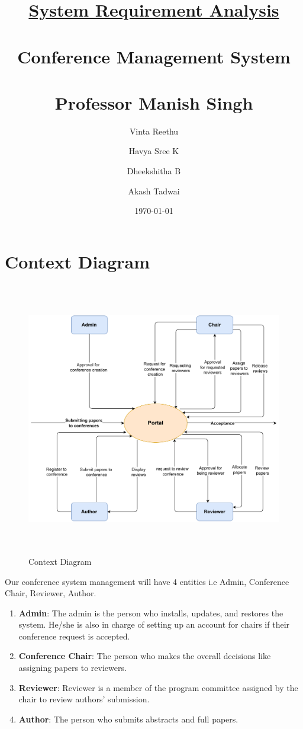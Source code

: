 \documentclass[english,a4paper,12pt]{report}
\title{\textbf{\underline{\Huge{System Requirement Analysis}}}\\~\\
\textbf{Conference Management System}\\~\\ 
Professor Manish Singh\\
}
\author{Vinta Reethu \and Havya Sree K \and Dheekshitha B \and Akash Tadwai }
\date{\today}
\begin{document}
\titleformat{\chapter}[display]   
{\normalfont\huge\bfseries}{\chaptertitlename\ \thechapter}{20pt}{\Huge}   
\titlespacing*{\chapter}{0pt}{-10pt}{40pt}
\maketitle

\newpage

\section*{Context Diagram}
\begin{figure}[h!]
\centering
 \includegraphics[keepaspectratio,width=17cm,height=12cm]{SRA-Images/context-diagram.pdf}
\caption{Context Diagram}
\end{figure}

Our conference system management will have 4 entities i.e Admin, Conference Chair, Reviewer, Author. 
\begin{enumerate}
    \item \textbf{Admin}: The admin is the person who installs, updates, and restores the system. He/she is also in charge of setting up an account for chairs if their conference request is accepted.
    \item \textbf{Conference Chair}: The person who makes the overall decisions like assigning papers to reviewers. 
    \item \textbf{Reviewer}: Reviewer is a member of the program committee assigned by the chair to review authors' submission.
    \item \textbf{Author}: The person who submits abstracts and full papers.
\end{enumerate}
\vspace{2cm}
\end{document}
